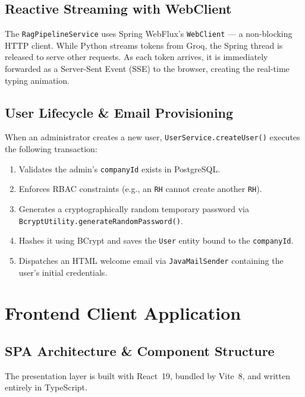 \documentclass[12pt,a4paper]{report}
\begin{document}
\section{Reactive Streaming with WebClient}

The \texttt{RagPipelineService} uses Spring WebFlux's \texttt{WebClient} — a non-blocking HTTP client. While Python streams tokens from Groq, the Spring thread is released to serve other requests. As each token arrives, it is immediately forwarded as a Server-Sent Event (SSE) to the browser, creating the real-time typing animation.

\section{User Lifecycle \& Email Provisioning}

When an administrator creates a new user, \texttt{UserService.createUser()} executes the following transaction:

\begin{enumerate}[label=\arabic*.]
  \item Validates the admin's \texttt{companyId} exists in PostgreSQL.
  \item Enforces RBAC constraints (e.g., an \texttt{RH} cannot create another \texttt{RH}).
  \item Generates a cryptographically random temporary password via \texttt{BcryptUtility.generateRandomPassword()}.
  \item Hashes it using BCrypt and saves the \texttt{User} entity bound to the \texttt{companyId}.
  \item Dispatches an HTML welcome email via \texttt{JavaMailSender} containing the user's initial credentials.
\end{enumerate}

\clearpage
\chapter{Frontend Client Application}

\section{SPA Architecture \& Component Structure}

The presentation layer is built with React~19, bundled by Vite~8, and written entirely in TypeScript.
\end{document}
